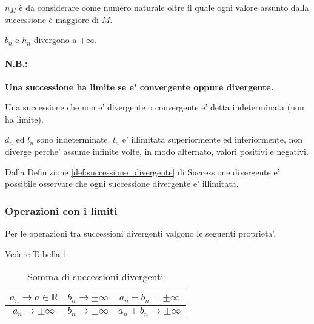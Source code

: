 $n_M$ è da considerare come numero naturale oltre il quale ogni valore assunto dalla successione è maggiore di $M$.

\begin{example}
    $b_n$ e $h_n$ divergono a $+\infty$.
\end{example}

\paragraph{N.B.:}\textbf{Una successione ha limite se e' convergente oppure divergente.}

\begin{definition}
    Una successione che non e' divergente o convergente e' detta indeterminata (non ha limite).
\end{definition}

\begin{example}
    $d_n$ ed $l_n$ sono indeterminate. $l_n$ e' illimitata superiormente ed inferiormente, non diverge perche' assume infinite volte, in modo alternato, valori positivi e negativi.
\end{example}

\begin{remark}\label{re:successione_divergente_illimitata}
    Dalla Definizione \ref{def:successione_divergente} di Successione divergente e' possibile osservare che ogni successione divergente e' illimitata.
\end{remark}

\subsubsection{Operazioni con i limiti}
Per le operazioni tra successioni divergenti valgono le seguenti proprieta'.
\begin{property}
    Vedere Tabella \ref{tab:somma_successioni_divergenti}.
    \begin{table}[!hbt]
        \centering
        \begin{tabular}{|c|c|c|}
            \hline
            $a_n\rightarrow a\in\mathbb R$ & $b_n\rightarrow\pm\infty$ & $a_n+b_n = \pm\infty$\\
            \hline
            $a_n \rightarrow\pm\infty$ & $b_n\rightarrow\pm\infty$ & $a_n+b_n\rightarrow\pm\infty$\\
            \hline
        \end{tabular}
        \caption{Somma di successioni divergenti}
        \label{tab:somma_successioni_divergenti}
    \end{table}
\end{property}

